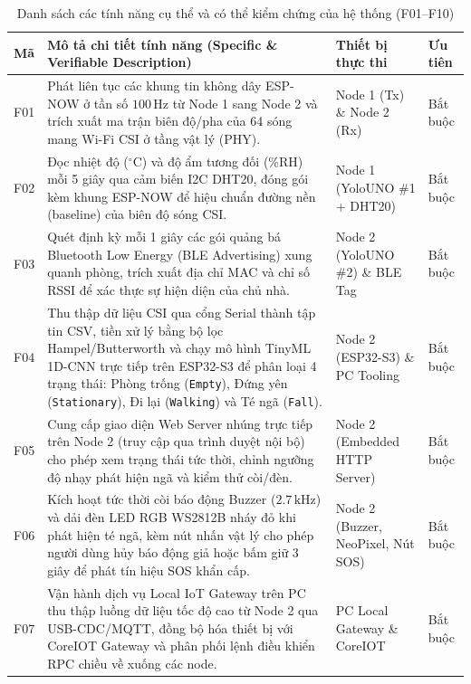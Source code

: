 \documentclass{hcmut-report}
\renewcommand{\arraystretch}{1.26}
\begin{document}
\begin{table}[H]
\centering
\caption{Danh sách các tính năng cụ thể và có thể kiểm chứng của hệ thống (F01--F10)}
\label{tab:system_features}
\footnotesize
\renewcommand{\arraystretch}{1.12}
\begin{tabularx}{\textwidth}{|C{0.8cm}|Y|P{3.4cm}|C{1.5cm}|}
\hline
\textbf{Mã} & \textbf{Mô tả chi tiết tính năng (Specific \& Verifiable Description)} & \textbf{Thiết bị thực thi} & \textbf{Ưu tiên} \\
\hline
F01 & Phát liên tục các khung tin không dây ESP-NOW ở tần số $100\,\text{Hz}$ từ Node 1 sang Node 2 và trích xuất ma trận biên độ/pha của 64 sóng mang Wi-Fi CSI ở tầng vật lý (PHY). & Node 1 (Tx) \& Node 2 (Rx) & Bắt buộc \\
\hline
F02 & Đọc nhiệt độ ($^\circ\text{C}$) và độ ẩm tương đối ($\%\text{RH}$) mỗi 5 giây qua cảm biến I2C DHT20, đóng gói kèm khung ESP-NOW để hiệu chuẩn đường nền (baseline) của biên độ sóng CSI. & Node 1 (YoloUNO \#1 + DHT20) & Bắt buộc \\
\hline
F03 & Quét định kỳ mỗi 1 giây các gói quảng bá Bluetooth Low Energy (BLE Advertising) xung quanh phòng, trích xuất địa chỉ MAC và chỉ số RSSI để xác thực sự hiện diện của chủ nhà. & Node 2 (YoloUNO \#2) \& BLE Tag & Bắt buộc \\
\hline
F04 & Thu thập dữ liệu CSI qua cổng Serial thành tập tin CSV, tiền xử lý bằng bộ lọc Hampel/Butterworth và chạy mô hình TinyML 1D-CNN trực tiếp trên ESP32-S3 để phân loại 4 trạng thái: Phòng trống (\texttt{Empty}), Đứng yên (\texttt{Stationary}), Đi lại (\texttt{Walking}) và Té ngã (\texttt{Fall}). & Node 2 (ESP32-S3) \& PC Tooling & Bắt buộc \\
\hline
F05 & Cung cấp giao diện Web Server nhúng trực tiếp trên Node 2 (truy cập qua trình duyệt nội bộ) cho phép xem trạng thái tức thời, chỉnh ngưỡng độ nhạy phát hiện ngã và kiểm thử còi/đèn. & Node 2 (Embedded HTTP Server) & Bắt buộc \\
\hline
F06 & Kích hoạt tức thời còi báo động Buzzer ($2.7\,\text{kHz}$) và dải đèn LED RGB WS2812B nháy đỏ khi phát hiện té ngã, kèm nút nhấn vật lý cho phép người dùng hủy báo động giả hoặc bấm giữ 3 giây để phát tín hiệu SOS khẩn cấp. & Node 2 (Buzzer, NeoPixel, Nút SOS) & Bắt buộc \\
\hline
F07 & Vận hành dịch vụ Local IoT Gateway trên PC thu thập luồng dữ liệu tốc độ cao từ Node 2 qua USB-CDC/MQTT, đồng bộ hóa thiết bị với CoreIOT Gateway và phân phối lệnh điều khiển RPC chiều về xuống các node. & PC Local Gateway \& CoreIOT & Bắt buộc \\

\end{tabularx}
\end{table}
\end{document}
